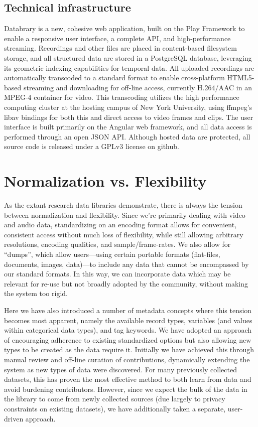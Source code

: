 \documentclass{sig-alternate}
\begin{document}
\subsection{Technical infrastructure}

Databrary is a new, cohesive web application, built on the Play Framework to enable a responsive user interface, a complete API, and high-performance streaming.
Recordings and other files are placed in content-based filesystem storage, and all structured data are stored in a PostgreSQL database, leveraging its geometric indexing capabilities for temporal data.
All uploaded recordings are automatically transcoded to a standard format to enable cross-platform HTML5-based streaming and downloading for off-line access, currently H.264/AAC in an MPEG-4 container for video.
This transcoding utilizes the high performance computing cluster at the hosting campus of New York University, using ffmpeg's libav bindings for both this and direct access to video frames and clips.
The user interface is built primarily on the Angular web framework, and all data access is performed through an open JSON API.
Although hosted data are protected, all source code is released under a GPLv3 license on github.

\section{Normalization vs. Flexibility}

As the extant research data libraries demonstrate, there is always the tension between normalization and flexibility.
Since we're primarily dealing with video and audio data, standardizing on an encoding format allows for convenient, consistent access without much loss of flexibility, while still allowing arbitrary resolutions, encoding qualities, and sample/frame-rates.
We also allow for ``dumps'', which allow users---using certain portable formats (flat-files, documents, images, data)---to include any data that cannot be encompassed by our standard formats.
In this way, we can incorporate data which may be relevant for re-use but not broadly adopted by the community, without making the system too rigid.

Here we have also introduced a number of metadata concepts where this tension becomes most apparent, namely the available record types, variables (and values within categorical data types), and tag keywords.
We have adopted an approach of encouraging adherence to existing standardized options but also allowing new types to be created as the data require it.
Initially we have achieved this through manual review and off-line curation of contributions, dynamically extending the system as new types of data were discovered.
For many previously collected datasets, this has proven the most effective method to both learn from data and avoid burdening contributors.
However, since we expect the bulk of the data in the library to come from newly collected sources (due largely to privacy constraints on existing datasets), we have additionally taken a separate, user-driven approach.
\end{document}
